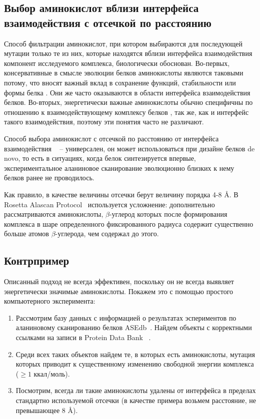 \subsection{Выбор аминокислот вблизи интерфейса взаимодействия с отсечкой по расстоянию}

Способ фильтрации аминокислот, при котором выбираются для последующей мутации только те из них, которые находятся вблизи интерфейса взаимодействия компонент исследуемого комплекса, биологически обоснован. Во-первых,  консервативные в смысле эволюции белков аминокислоты являются таковыми потому, что вносят важный вклад в сохранение функций, стабильности или формы белка \cite{toadd}. Они же часто оказываются в области интерфейса взаимодействия белков. Во-вторых, энергетически важные аминокислоты обычно специфичны по отношению к взаимодействующему комплексу белков \cite{toadd1}, так же, как и интерфейс такого взаимодействия, поэтому эти понятия часто не различают.

Способ выбора аминокислот с  отсечкой по расстоянию от интерфейса взаимодействия ~\cite{kortemme2004} -- универсален, он может использоваться при дизайне белков de novo, то есть в ситуациях, когда белок синтезируется впервые, экспериментальное аланиновое сканирование эволюционно близких к нему белков ранее не проводилось. 

Как правило, в качестве величины отсечки берут величину порядка  4-8 \AA{}. В  Rosetta Alascan Protocol~\cite{kortemme2004} используется усложнение: дополнительно рассматриваются аминокислоты, $\beta$-углерод которых после формирования комплекса в шаре определенного фиксированного радиуса содержит существенно больше атомов $\beta$-углерода, чем содержал до этого.
\subsection{Контрпример}
Описанный подход не всегда эффективен, поскольку он не всегда выявляет энергетически значимые аминокислоты. Покажем это с помощью простого компьютерного эксперимента:
\begin{enumerate}
\item Рассмотрим базу данных с информацией о результатах эспериментов по аланиновому сканированию белков ASEdb~\cite{asedb2001}. Найдем объекты с корректными ссылками на записи в Protein Data Bank ~\cite{rcsb}.
\item Среди всех таких объектов найдем те, в которых есть аминокислоты, мутация которых приводит к существенному изменению свободной энергии комплекса ($\geq 1$ ккал/моль).
\item Посмотрим, всегда ли такие аминокислоты удалены от интерфейса в пределах стандартно используемой отсечки (в качестве примера возьмем расстояние, не превышающее 8 \AA{}).
\end{enumerate}

